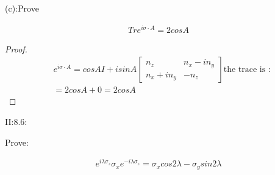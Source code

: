 \documentclass{article}
\begin{document}
(c):Prove

\begin{align*}Tre^{i\sigma\cdot A}=2cosA\end{align*}

\begin{proof}
  \begin{align*}
&e^{i\sigma\cdot A}=cosAI+isinA\begin{bmatrix}
      n_z&n_x-in_y\\
      n_x+in_y&-n_z
    \end{bmatrix}\text{the trace is :}\\
&=2cosA+0=2cosA
  \end{align*}
\end{proof}

\newpage

II:8.6:

Prove:

\begin{align*}e^{i\lambda\sigma_z}\sigma_xe^{-i\lambda\sigma_z}=\sigma_xcos2\lambda-\sigma_ysin2\lambda\end{align*}
\end{document}
